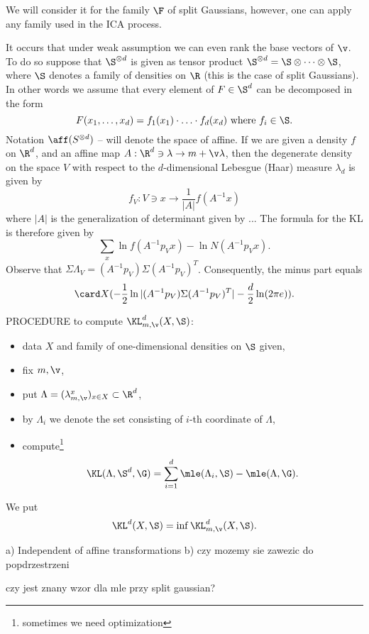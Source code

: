 We will consider it for the family $\F$ of split Gaussians, however, one can apply any family used in the ICA process.
 
	 It occurs that under weak assumption we can even rank the base vectors of $\v$. To do so suppose that $\S^{\otimes d}$ is given as tensor product 
$\S^{\otimes d}=\S \otimes \cdots \otimes \S$, where $\S$ denotes a family of densities on $\R$
(this is the case of split Gaussians). 
In other words we assume that every element of $F \in \S^d$ can be decomposed in the form 
$$
F(x_1,\ldots,x_d)=f_1(x_1) \cdot \ldots \cdot f_d(x_d)\text{ where }f_i \in \S.
$$
Notation $\aff(S^{\otimes d})$ -- will denote the space of affine. If we are given
a density $f$ on $\R^d$, and an affine map $A:\R^d \ni \lambda \to m+\v \lambda$, then
the degenerate density on the space $V$ with respect to the $d$-dimensional Lebesgue (Haar) measure  $\lambda_d$ is given by
$$
f_V:V \ni x \to \frac{1}{|A|}f(A^{-1}x)
$$
where $|A|$ is the generalization of determinant given by ... 
The formula for the KL is therefore given by
$$
\sum_x \ln f(A^{-1}p_Vx) -\ln N(A^{-1}p_Vx).
$$
Observe that $\Sigma \Lambda_V=(A^{-1}p_V)\Sigma(A^{-1}p_V)^T$.
Consequently, the minus part equals
$$
\card X(-\frac{1}{2}\ln |(A^{-1}p_V)\Sigma(A^{-1}p_V)^T|-\frac{d}{2}\ln(2\pi e)).
$$

PROCEDURE to compute $\KL^d_{m,\v}(X,\S)$:
\begin{itemize}
\item data $X$ and family of one-dimensional densities on $\S$ given,
\item fix $m,\v$,
\item put $\Lambda=(\lambda_{m,\v}^x)_{x \in X} \subset \R^d$,
\item by $\Lambda_i$ we denote the set consisting of $i$-th coordinate of $\Lambda$,
\item compute\footnote{sometimes we need optimization}
$$
\KL(\Lambda,\S^d,\G)=\sum_{i=1}^d \mle(\Lambda_i,\S)-\mle(\Lambda,\G).
$$
\end{itemize}

We put
$$
\KL^d(X,\S)=\inf \KL^d_{m,\v}(X,\S).
$$

\begin{theorem}
a) Independent of affine transformations b) czy mozemy sie zawezic do popdrzestrzeni
\end{theorem}

\begin{problem}
czy jest znany wzor dla mle przy split gaussian?
\end{problem}

